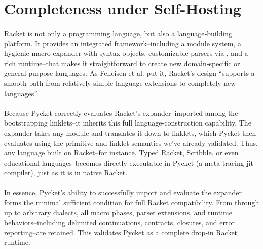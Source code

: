 	\section[\texorpdfstring{Completeness under Self-Hosting}{Completeness}]{Completeness under Self-Hosting}

		\paragraph{}%
			Racket is not only a programming language, but also a language‐building platform. It provides an integrated framework--including a module system, a hygienic macro expander with syntax objects, customizable parsers via , and a rich runtime--that makes it straightforward to create new domain‑specific or general‑purpose languages. As Felleisen et al. put it, Racket’s design “supports a smooth path from relatively simple language extensions to completely new languages” \cite{racket:create-langs}.

		\paragraph{}%
			Because Pycket correctly evaluates Racket's expander--imported among the bootstrapping linklets--it inherits this full language‑construction capability. The expander takes any  module and translates it down to linklets, which Pycket then evaluates using the primitive and linklet semantics we've already validated. Thus, any language built on Racket--for instance, Typed Racket, Scribble, or even educational languages--becomes directly executable in Pycket (a meta-tracing \gls{jit} compiler), just as it is in native Racket.

		\paragraph{}%
			In essence, Pycket’s ability to successfully import and evaluate the expander forms the minimal sufficient condition for full Racket compatibility. From  through  up to arbitrary  dialects, all macro phases, parser extensions, and runtime behaviors--including delimited continuations, contracts, closures, and error reporting--are retained. This validates Pycket as a complete drop‑in Racket runtime.

